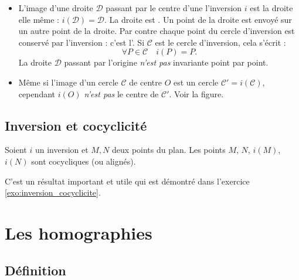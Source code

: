\documentclass[11pt,class=report,crop=false]{standalone}
\newcommand{\inversion}{i}
\begin{document}
\begin{remarque*}
\sauteligne
\begin{itemize}
 \item L'image d'une droite $\mathcal{D}$ passant par le centre d'une l'inversion $\inversion$ est la droite elle même :
 $\inversion(\mathcal{D})=\mathcal{D}$. La droite est . Un point de la droite
 est envoyé sur un autre point de la droite.
 Par contre chaque point du cercle d'inversion est conservé par l'inversion : c'est l'.
 Si $\mathcal{C}$ est le cercle d'inversion, cela s'écrit :
 $$\forall P \in \mathcal{C} \quad \inversion(P)=P.$$
 La droite $\mathcal{D}$ passant par l'origine \emph{n'est pas} invariante point par point.
 
 \item Même si l'image d'un cercle $\mathcal{C}$ de centre $O$ est un cercle $\mathcal{C}' = \inversion(\mathcal{C})$, cependant 
 $\inversion(O)$ \emph{n'est pas} le centre de $\mathcal{C}'$. Voir la figure.
 
\end{itemize}
\end{remarque*}




\subsection{Inversion et cocyclicité}


\begin{proposition}
\label{prop:cocycl}
Soient $\inversion$ un inversion et $M, N$ deux points du plan.
Les points $M$, $N$, $\inversion(M)$, $\inversion(N)$ sont cocycliques (ou alignés).
\end{proposition}

C'est un résultat important et utile qui est démontré dans l'exercice \ref{exo:inversion_cocyclicite}.


\section{Les homographies}

\subsection{Définition}
\end{document}
